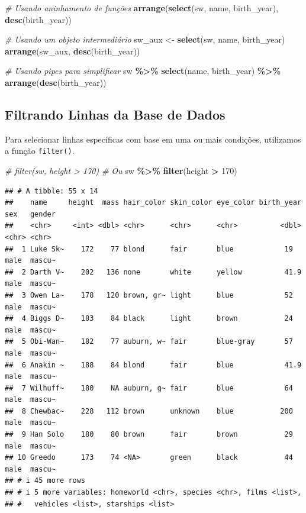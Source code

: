 \documentclass[
]{book}
\newenvironment{Shaded}{\begin{snugshade}}{\end{snugshade}}
\newcommand{\CommentTok}[1]{\textcolor[rgb]{0.56,0.35,0.01}{\textit{#1}}}
\newcommand{\DecValTok}[1]{\textcolor[rgb]{0.00,0.00,0.81}{#1}}
\newcommand{\FunctionTok}[1]{\textcolor[rgb]{0.13,0.29,0.53}{\textbf{#1}}}
\newcommand{\NormalTok}[1]{#1}
\newcommand{\OtherTok}[1]{\textcolor[rgb]{0.56,0.35,0.01}{#1}}
\newcommand{\SpecialCharTok}[1]{\textcolor[rgb]{0.81,0.36,0.00}{\textbf{#1}}}
\begin{document}
\begin{Shaded}
\begin{Highlighting}[]
\CommentTok{\# Usando aninhamento de funções}
\FunctionTok{arrange}\NormalTok{(}\FunctionTok{select}\NormalTok{(sw, name, birth\_year), }\FunctionTok{desc}\NormalTok{(birth\_year))}

\CommentTok{\# Usando um objeto intermediário}
\NormalTok{sw\_aux }\OtherTok{\textless{}{-}} \FunctionTok{select}\NormalTok{(sw, name, birth\_year)}
\FunctionTok{arrange}\NormalTok{(sw\_aux, }\FunctionTok{desc}\NormalTok{(birth\_year))}

\CommentTok{\# Usando pipes para simplificar}
\NormalTok{sw }\SpecialCharTok{\%\textgreater{}\%} 
  \FunctionTok{select}\NormalTok{(name, birth\_year) }\SpecialCharTok{\%\textgreater{}\%} 
  \FunctionTok{arrange}\NormalTok{(}\FunctionTok{desc}\NormalTok{(birth\_year))}
\end{Highlighting}
\end{Shaded}

\subsection{Filtrando Linhas da Base de Dados}\label{filtrando-linhas-da-base-de-dados}

Para selecionar linhas específicas com base em uma ou mais condições,
utilizamos a função \texttt{filter()}.

\begin{Shaded}
\begin{Highlighting}[]
\CommentTok{\# filter(sw, height \textgreater{} 170)}
\CommentTok{\# Ou}
\NormalTok{sw }\SpecialCharTok{\%\textgreater{}\%} \FunctionTok{filter}\NormalTok{(height }\SpecialCharTok{\textgreater{}} \DecValTok{170}\NormalTok{)}
\end{Highlighting}
\end{Shaded}

\begin{verbatim}
## # A tibble: 55 x 14
##    name     height  mass hair_color skin_color eye_color birth_year sex   gender
##    <chr>     <int> <dbl> <chr>      <chr>      <chr>          <dbl> <chr> <chr> 
##  1 Luke Sk~    172    77 blond      fair       blue            19   male  mascu~
##  2 Darth V~    202   136 none       white      yellow          41.9 male  mascu~
##  3 Owen La~    178   120 brown, gr~ light      blue            52   male  mascu~
##  4 Biggs D~    183    84 black      light      brown           24   male  mascu~
##  5 Obi-Wan~    182    77 auburn, w~ fair       blue-gray       57   male  mascu~
##  6 Anakin ~    188    84 blond      fair       blue            41.9 male  mascu~
##  7 Wilhuff~    180    NA auburn, g~ fair       blue            64   male  mascu~
##  8 Chewbac~    228   112 brown      unknown    blue           200   male  mascu~
##  9 Han Solo    180    80 brown      fair       brown           29   male  mascu~
## 10 Greedo      173    74 <NA>       green      black           44   male  mascu~
## # i 45 more rows
## # i 5 more variables: homeworld <chr>, species <chr>, films <list>,
## #   vehicles <list>, starships <list>
\end{verbatim}
\end{document}
